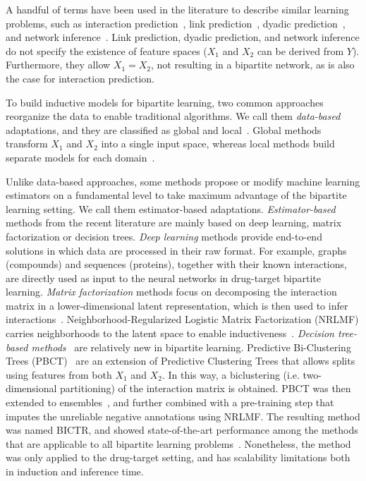 \documentclass[letterpaper]{article}
\begin{document}
A handful of terms have been used in the literature to describe similar learning problems,
such as interaction prediction~\cite{schrynemackers_classifying_2015,pliakos_network_2019,chen_machine_2018,bagherian_machine_2020}, link prediction~\cite{lu_link_2011,zhou_progresses_2021}, dyadic prediction~\cite{menon_log-linear_2010,pahikkala_two-step_2014,jin_multitask_2017}, and network inference~\cite{park_flaws_2012,pahikkala_toward_2015,schrynemackers_protocols_2013,pliakos_network_2019}.
Link prediction, dyadic prediction, and network inference do not specify the existence of feature spaces ($X_1$ and $X_2$ can be derived from $Y$). Furthermore, they allow $X_1 = X_2$, not resulting in a bipartite network, as is also the case for interaction prediction.

To build inductive models for bipartite learning,
two common approaches reorganize the data to enable traditional algorithms. We call them \emph{data-based} adaptations, and they are classified as global and local~\cite{schrynemackers_classifying_2015}.
Global methods transform $X_1$ and $X_2$ into a single input space, whereas local methods build separate models for each domain~\cite{schrynemackers_classifying_2015}.

Unlike data-based approaches, some methods propose or modify machine learning estimators on a fundamental level to take maximum advantage of the bipartite learning setting.
We call them estimator-based adaptations.
\emph{Estimator-based} methods from the recent literature are mainly based on deep learning, matrix factorization or decision trees.
\emph{Deep learning} methods provide end-to-end solutions in which data are processed in their raw format. For example, graphs (compounds) and sequences (proteins), together with their known interactions, are directly used as input to the neural networks in drug-target bipartite learning.
\emph{Matrix factorization} methods focus on decomposing the interaction matrix in a lower-dimensional latent representation, which is then used to infer interactions~\cite{guo2024rise,chen2022review}. Neighborhood-Regularized Logistic Matrix Factorization (NRLMF) carries neighborhoods to the latent space to enable inductiveness~\cite{liu_neighborhood_2016,liu_lpi-nrlmf_2017,liu_predicting_2020}.
%
\emph{Decision tree-based methods}~\cite{costa2023recent,blockeel2023decision} are relatively new in bipartite learning. Predictive Bi-Clustering Trees (PBCT)~\cite{pliakos_global_2018} are an extension of Predictive Clustering Trees \cite{blockeel1998top} that allows splits using features from both $X_1$ and $X_2$.
In this way, a biclustering (i.e. two-dimensional partitioning) of the interaction matrix is obtained.
PBCT was then extended to ensembles~\cite{pliakos_network_2019}, and further combined with a pre-training step that imputes the unreliable negative annotations using NRLMF.
The resulting method was named BICTR, and showed state-of-the-art performance among the methods that are applicable to all bipartite learning problems~\cite{pliakos_drug-target_2020}.
Nonetheless, the method was only applied to the drug-target setting, and has scalability limitations both in induction and inference time. 
\end{document}
